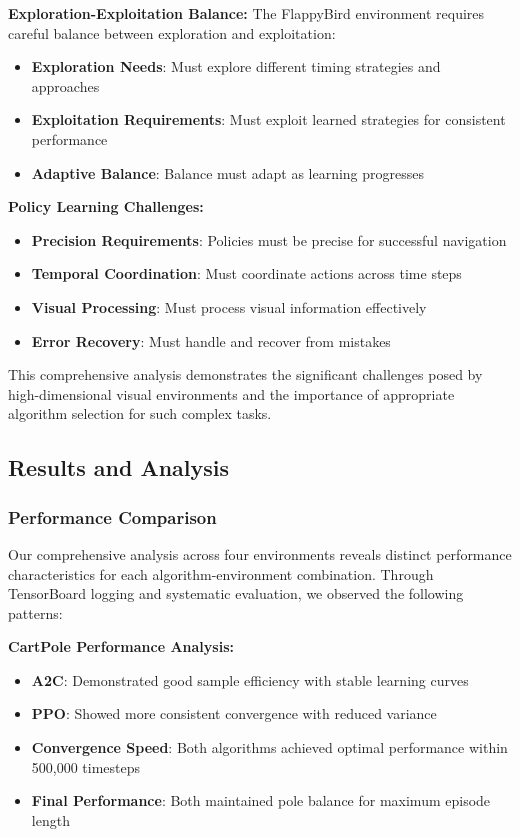 \documentclass[12pt]{article}
\begin{document}
{{{\textbf{Exploration-Exploitation Balance:}
The FlappyBird environment requires careful balance between exploration and exploitation:

\begin{itemize}
    \item \textbf{Exploration Needs}: Must explore different timing strategies and approaches
    \item \textbf{Exploitation Requirements}: Must exploit learned strategies for consistent performance
    \item \textbf{Adaptive Balance}: Balance must adapt as learning progresses
\end{itemize}

\textbf{Policy Learning Challenges:}
\begin{itemize}
    \item \textbf{Precision Requirements}: Policies must be precise for successful navigation
    \item \textbf{Temporal Coordination}: Must coordinate actions across time steps
    \item \textbf{Visual Processing}: Must process visual information effectively
    \item \textbf{Error Recovery}: Must handle and recover from mistakes
\end{itemize}

This comprehensive analysis demonstrates the significant challenges posed by high-dimensional visual environments and the importance of appropriate algorithm selection for such complex tasks.

\subsection{Results and Analysis}

\subsubsection{Performance Comparison}

Our comprehensive analysis across four environments reveals distinct performance characteristics for each algorithm-environment combination. Through TensorBoard logging and systematic evaluation, we observed the following patterns:

\textbf{CartPole Performance Analysis:}
\begin{itemize}
    \item \textbf{A2C}: Demonstrated good sample efficiency with stable learning curves
    \item \textbf{PPO}: Showed more consistent convergence with reduced variance
    \item \textbf{Convergence Speed}: Both algorithms achieved optimal performance within 500,000 timesteps
    \item \textbf{Final Performance}: Both maintained pole balance for maximum episode length
\end{itemize}

}}}
\end{document}
